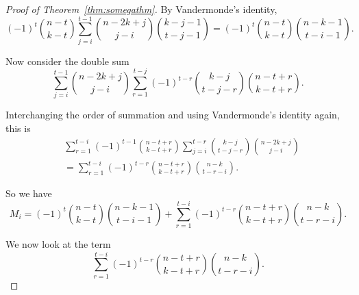 \documentclass[12pt]{article}
\theoremstyle{definition}
\theoremstyle{remark}
\begin{document}
\begin{proof}[Proof of Theorem~\ref{thm:somegathm}]
By Vandermonde's identity,
\[(-1)^{t}\binom{n-t}{k-t}\sum_{j=i}^{t-1}\binom{n-2k+j}{j-i}\binom{k-j-1}{t-j-1} = (-1)^t\binom{n-t}{k-t}\binom{n-k-1}{t-i-1}.\]

Now consider the double sum
\[\sum_{j=i}^{t-1}\binom{n-2k+j}{j-i}\sum_{r=1}^{t-j}(-1)^{t-r}\binom{k-j}{t-j-r}\binom{n-t+r}{k-t+r}.\]

Interchanging the order of summation and using Vandermonde's identity again, this is 
\begin{align*}
&\sum_{r=1}^{t-i}(-1)^{t-1}\binom{n-t+r}{k-t+r} \sum_{j=i}^{t-r}\binom{k-j}{t-j-r}\binom{n-2k+j}{j-i}\\
&=\sum_{r=1}^{t-i}(-1)^{t-r}\binom{n-t+r}{k-t+r}\binom{n-k}{t-r-i}.
\end{align*}

So we have
\begin{equation}\label{mainsum}
M_i = (-1)^t\binom{n-t}{k-t}\binom{n-k-1}{t-i-1} + \sum_{r=1}^{t-i}(-1)^{t-r}\binom{n-t+r}{k-t+r}\binom{n-k}{t-r-i}.
\end{equation}

We now look at the term 
\begin{equation}\label{eqn:n-t+r}
 \sum_{r=1}^{t-i}(-1)^{t-r}\binom{n-t+r}{k-t+r}\binom{n-k}{t-r-i}.
 \end{equation}


\end{proof}
\end{document}
